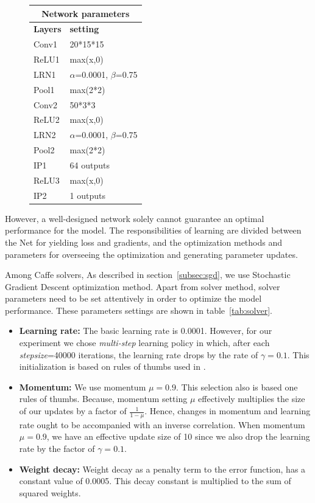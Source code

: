 \begin{figure}[H]
\centering
\begin{tabular}{ |p{2cm}|p{2.5cm}| }
\hline 
\multicolumn{2}{|c|}{\textbf{Network parameters}} \\
\hline
\hline
\textbf{Layers} & \textbf{setting }\\
\hline
Conv1 & 20*15*15\\
\hline
ReLU1 & max(x,0)  \\
\hline
LRN1 & $\alpha$=0.0001, $\beta$=0.75\\
\hline
Pool1    & max(2*2) \\
\hline
Conv2 & 50*3*3\\
\hline
ReLU2 & max(x,0)  \\
\hline
LRN2 & $\alpha$=0.0001, $\beta$=0.75\\
\hline
Pool2    & max(2*2) \\
\hline
IP1 & 64 outputs \\
\hline
ReLU3 & max(x,0)  \\
\hline
IP2 & 1 outputs \\
\hline
\end{tabular}
\end{figure}

However, a well-designed network solely cannot guarantee an optimal performance for the model. The responsibilities of learning are divided between the Net for yielding loss and gradients, and the optimization methods and parameters for overseeing the optimization and generating parameter updates. 

Among Caffe solvers, As described in section~\ref{subsec:sgd}, we use Stochastic Gradient Descent optimization method. Apart from solver method, solver parameters need to be set attentively in order to optimize the model performance. These parameters settings are shown in table~\ref{tab:solver}.


\begin{itemize}
\item \textbf{Learning rate:} The basic learning rate is 0.0001. However, for our experiment we chose \textit{multi-step} learning policy in which, after each \textit{stepsize}=40000 iterations, the learning rate drops by the rate of $\gamma = 0.1$. This initialization is based on rules of thumbs used in \cite{krizhevsky2012imagenet}.
\item \textbf{Momentum:} We use momentum $\mu = 0.9$. This selection also is based one rules of thumbs. Because, momentum setting $\mu$ effectively multiplies the size of our updates by a factor of $\frac{1}{1-\mu}$. Hence, changes in momentum and learning rate ought to be accompanied with an inverse correlation. When momentum $\mu = 0.9$, we have an effective update size of 10 since we also drop the learning rate by the factor of $\gamma= 0.1$.
\item \textbf{Weight decay:} Weight decay as a penalty term to the error function, has a constant value of 0.0005. This decay constant is multiplied to the sum of squared weights.
\end{itemize}










